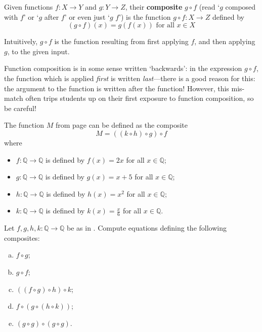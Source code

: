 \begin{definition}
\label{defComposition} \label{defComposite}
Given functions $f : X \to Y$ and $g : Y \to Z$, their \textbf{composite} $g \circ f$  (read `$g$ composed with $f$' or `$g$ after $f$' or even just `$g$ $f$') is the function $g \circ f : X \to Z$ defined by
\[ (g \circ f)(x) = g(f(x)) \text{ for all } x \in X \]
\end{definition}
Intuitively, $g \circ f$ is the function resulting from first applying $f$, and then applying $g$, to the given input.

\begin{commonerror}
Function composition is in some sense written `backwards': in the expression $g \circ f$, the function which is applied \textit{first} is written \textit{last}---there is a good reason for this: the argument to the function is written after the function! However, this mis-match often trips students up on their first exposure to function composition, so be careful!
\end{commonerror}

\begin{example}
\label{exDecompositionOfFunctionQToQ}
The function $M$ from page \pageref{txtAlgorithmicallyDefinedFunctionExample} can be defined as the composite
\[ M = ((k \circ h) \circ g) \circ f \]
where
\begin{itemize}
\item $f : \mathbb{Q} \to \mathbb{Q}$ is defined by $f(x)=2x$ for all $x \in \mathbb{Q}$;
\item $g : \mathbb{Q} \to \mathbb{Q}$ is defined by $g(x)=x+5$ for all $x \in \mathbb{Q}$;
\item $h : \mathbb{Q} \to \mathbb{Q}$ is defined by $h(x)=x^2$ for all $x \in \mathbb{Q}$;
\item $k : \mathbb{Q} \to \mathbb{Q}$ is defined by $k(x)=\frac{x}{6}$ for all $x \in \mathbb{Q}$.
\end{itemize}
\end{example}

\begin{exercise}
Let $f,g,h,k : \mathbb{Q} \to \mathbb{Q}$ be as in . Compute equations defining the following composites:
\begin{enumerate}[(a)]
\item $f \circ g$;
\item $g \circ f$;
\item $((f \circ g) \circ h) \circ k$;
\item $f \circ (g \circ (h \circ k))$;
\item $(g \circ g) \circ (g \circ g)$.
\end{enumerate}
\end{exercise}


